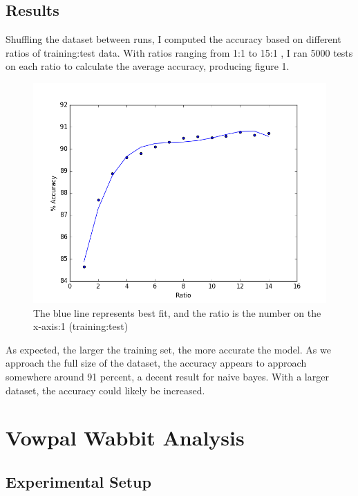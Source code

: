 \documentclass{article}
\begin{document}
\subsection{Results}

Shuffling the dataset between runs, I computed the accuracy based on different ratios of training:test data. With ratios ranging from 1:1 to 15:1 , I ran 5000 tests on each ratio to calculate the average accuracy, producing figure 1.

\begin{figure}[!ht]

\caption{The blue line represents best fit, and the ratio is the number on the x-axis:1 (training:test)}
\includegraphics[width=\columnwidth]{figure_1.png}

\end{figure}

As expected, the larger the training set, the more accurate the model. As we approach the full size of the dataset, the accuracy appears to approach somewhere around 91 percent, a decent result for naive bayes. With a larger dataset, the accuracy could likely be increased. 

\section{Vowpal Wabbit Analysis}

\subsection{Experimental Setup}
\end{document}
